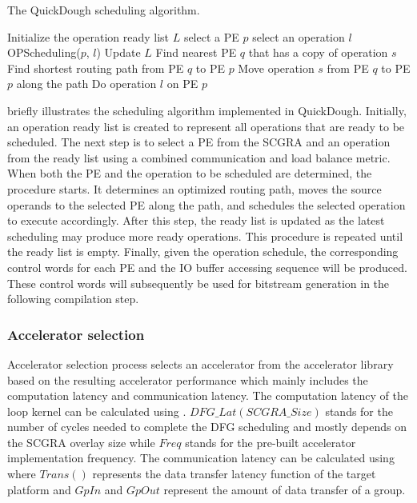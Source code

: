  \begin{algorithm}
 \small
 \caption{The QuickDough scheduling algorithm.}
 \label{alg:scheduling}
 \begin{algorithmic}
 \STATE Initialize the operation ready list $L$
 \STATE select a PE $p$
 \STATE select an operation $l$
 \STATE OPScheduling($p$, $l$)
 \STATE Update $L$
 \ENDWHILE
 \ENDPROCEDURE
 \STATE
 \STATE Find nearest PE $q$ that has a copy of operation $s$
 \STATE Find shortest routing path from PE $q$ to PE $p$
 \STATE Move operation $s$ from PE $q$ to PE $p$ along the path
 \ENDFOR
 \STATE Do operation $l$ on PE $p$
 \ENDPROCEDURE

 \end{algorithmic}
 \end{algorithm}

 briefly illustrates the scheduling algorithm implemented in QuickDough. Initially, an operation ready list is created to represent all operations that are ready to be scheduled. The next step is to select a PE from the SCGRA and an operation from the ready list using a combined communication and load balance metric. When both the PE and the operation to be scheduled are determined, the  procedure starts. It determines an optimized routing path, moves the source operands to the selected PE along the path, and schedules the selected operation to execute accordingly. After this step, the ready list is updated as the latest scheduling may produce more ready operations. This  procedure is repeated until the ready list is empty. Finally, given the operation schedule, the corresponding control words for each PE and the IO buffer accessing sequence will be produced. These control words will subsequently be used for bitstream generation in the following compilation step.

\subsubsection{Accelerator selection}
Accelerator selection process selects an accelerator from the accelerator library based on the resulting accelerator performance which mainly includes the computation latency and communication latency. The computation latency of the loop kernel can be calculated using . $DFG\_Lat(SCGRA\_Size)$ stands for the number of cycles needed to complete the DFG scheduling and mostly depends on the SCGRA overlay size while $Freq$ stands for the pre-built accelerator implementation frequency. The communication latency can be calculated using  where $Trans()$ represents the data transfer latency function of the target platform and $GpIn$ and $GpOut$ represent the amount of data transfer of a group.

